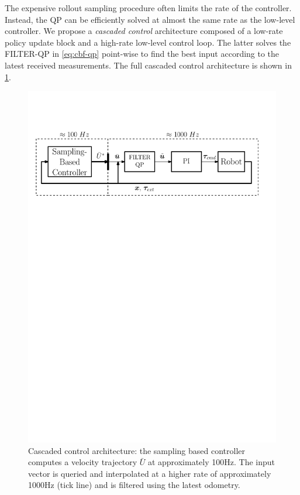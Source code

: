 The expensive rollout sampling procedure often limits the rate of the controller. Instead, the QP can be efficiently solved at almost the same rate as the low-level controller. We propose a \emph{cascaded control} architecture composed of a low-rate policy update block and a high-rate low-level control loop. The latter solves the FILTER-QP in \eqref{eq:cbf-qp} point-wise to find the best input according to the latest received measurements. The full cascaded control architecture is shown in \fig \ref{fig:cascaded_architecture}.

\begin{figure}[t!]
\centering
\hspace*{-0.7cm}
\includegraphics[width=1.1\columnwidth]{figures/schemes/high_level_architecture.pdf}
\caption{Cascaded control architecture: the sampling based controller computes a velocity trajectory $\bar{U}$ at approximately 100Hz. The input vector is queried and interpolated at a higher rate of approximately 1000Hz (tick line) and is filtered using the latest odometry.} \label{fig:cascaded_architecture}
\end{figure}


